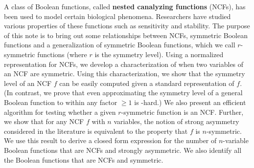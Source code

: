 A class of Boolean functions, 
called \textbf{nested canalyzing functions} (NCFs),
has been used to model certain biological phenomena.
Researchers have studied various properties of these functions
such as sensitivity and stability.
The purpose of this note is to bring out some relationships between NCFs, symmetric 
Boolean functions and a generalization of symmetric Boolean functions,
which we call $r$-symmetric functions (where $r$ is the symmetry level).
Using a normalized representation for NCFs, we develop a 
characterization of when two variables of an NCF are symmetric.
Using this characterization, we show 
that the symmetry level of an NCF $f$
can be easily computed given a standard representation of $f$.
(In contrast, we prove that even approximating the symmetry level of
a general Boolean function to within any factor $\geq 1$ is \cnp-hard.) 
We also present an efficient algorithm for testing whether 
a given $r$-symmetric function is an NCF.
Further, we show that for any NCF $f$ with $n$ variables, the notion of
strong asymmetry considered in the literature is equivalent to
the property that $f$ is $n$-symmetric. 
We use this result to derive a closed form expression for the
number of $n$-variable Boolean functions 
that are NCFs and strongly asymmetric.
We also identify all the Boolean functions that are NCFs 
and symmetric. 
